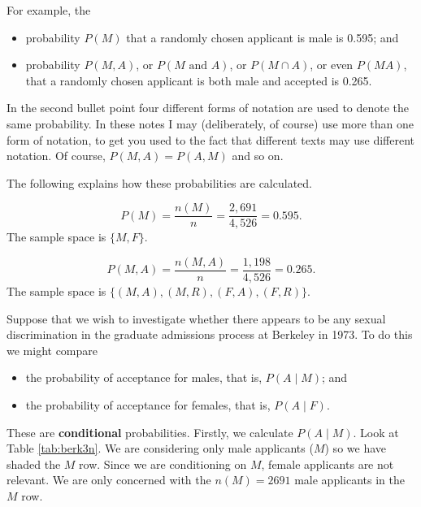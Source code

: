 \documentclass[
  british,
  11pt,
  openany, a4paper]{book}
\providecommand{\tightlist}{%
  \setlength{\itemsep}{0pt}\setlength{\parskip}{0pt}}
\begin{document}
For example, the

\begin{itemize}
\tightlist
\item
  probability \(P(M)\) that a randomly chosen applicant is male is 0.595; and
\item
  probability \(P(M, A)\), or \(P(M \text{ and } A)\), or \(P(M \cap A)\), or even \(P(MA)\), that a randomly chosen applicant is both male and accepted is 0.265.
\end{itemize}

In the second bullet point four different forms of notation are used to denote the same probability. In these notes I may (deliberately, of course) use more than one form of notation, to get you used to the fact that different texts may use different notation. Of course, \(P(M, A) = P(A, M)\) and so on.

The following explains how these probabilities are calculated.

\[P(M) = \frac{n(M)}{n} = \frac{2,691}{4,526} = 0.595.\]
The sample space is \(\{M,F\}\).

\[P(M , A) = \frac{n(M , A)}{n} = \frac{1,198}{4,526} = 0.265.\]
The sample space is \(\{(M , A),(M , R),(F , A),(F , R)\}\).

Suppose that we wish to investigate whether there appears to be any sexual discrimination in the graduate admissions process at Berkeley in 1973. To do this we might compare

\begin{itemize}
\tightlist
\item
  the probability of acceptance for males, that is, \(P(A \mid M)\); and
\item
  the probability of acceptance for females, that is, \(P(A \mid F)\).
\end{itemize}

These are \textbf{conditional} probabilities. Firstly, we calculate \(P(A \mid M)\). Look at Table \ref{tab:berk3n}. We are considering only male applicants (\(M\)) so we have shaded the \(M\) row. Since we are conditioning on \(M\), female applicants are not relevant. We are only concerned with the \(n(M)=2691\) male applicants in the \(M\) row.

 
  \providecommand{\huxb}[2]{\arrayrulecolor[RGB]{#1}\global\arrayrulewidth=#2pt}
  \providecommand{\huxvb}[2]{\color[RGB]{#1}\vrule width #2pt}
  \providecommand{\huxtpad}[1]{\rule{0pt}{#1}}
  \providecommand{\huxbpad}[1]{\rule[-#1]{0pt}{#1}}
\end{document}
